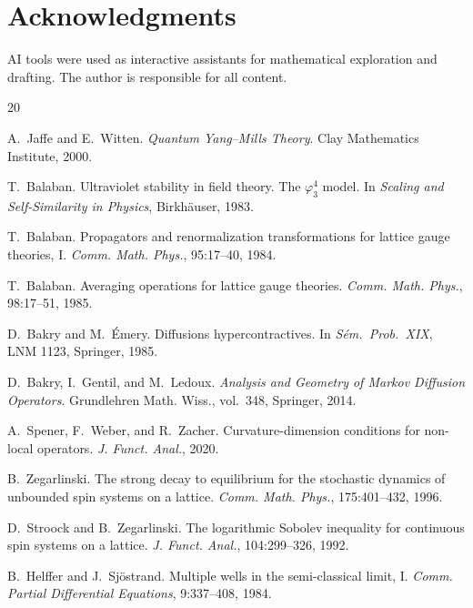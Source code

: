 \documentclass[11pt,a4paper]{article}
\theoremstyle{plain}
\theoremstyle{definition}
\theoremstyle{remark}
\begin{document}
\section*{Acknowledgments}
AI tools were used as interactive assistants for mathematical
exploration and drafting. The author is responsible for all content.


\begin{thebibliography}{20}

A.~Jaffe and E.~Witten.
\newblock \emph{Quantum Yang--Mills Theory}.
\newblock Clay Mathematics Institute, 2000.

T.~Balaban.
\newblock Ultraviolet stability in field theory. The $\varphi_3^4$ model.
\newblock In \emph{Scaling and Self-Similarity in Physics}, Birkh\"auser, 1983.

T.~Balaban.
\newblock Propagators and renormalization transformations for lattice gauge
  theories, {I}.
\newblock \emph{Comm. Math. Phys.}, 95:17--40, 1984.

T.~Balaban.
\newblock Averaging operations for lattice gauge theories.
\newblock \emph{Comm. Math. Phys.}, 98:17--51, 1985.

D.~Bakry and M.~\'Emery.
\newblock Diffusions hypercontractives.
\newblock In \emph{S\'em.\ Prob.\ XIX}, LNM 1123, Springer, 1985.

D.~Bakry, I.~Gentil, and M.~Ledoux.
\newblock \emph{Analysis and Geometry of Markov Diffusion Operators}.
\newblock Grundlehren Math. Wiss., vol.~348, Springer, 2014.

A.~Spener, F.~Weber, and R.~Zacher.
\newblock Curvature-dimension conditions for non-local operators.
\newblock \emph{J. Funct. Anal.}, 2020.

B.~Zegarlinski.
\newblock The strong decay to equilibrium for the stochastic dynamics of
  unbounded spin systems on a lattice.
\newblock \emph{Comm. Math. Phys.}, 175:401--432, 1996.

D.~Stroock and B.~Zegarlinski.
\newblock The logarithmic Sobolev inequality for continuous spin systems
  on a lattice.
\newblock \emph{J. Funct. Anal.}, 104:299--326, 1992.

B.~Helffer and J.~Sj\"ostrand.
\newblock Multiple wells in the semi-classical limit, {I}.
\newblock \emph{Comm. Partial Differential Equations}, 9:337--408, 1984.


\end{thebibliography}
\end{document}
